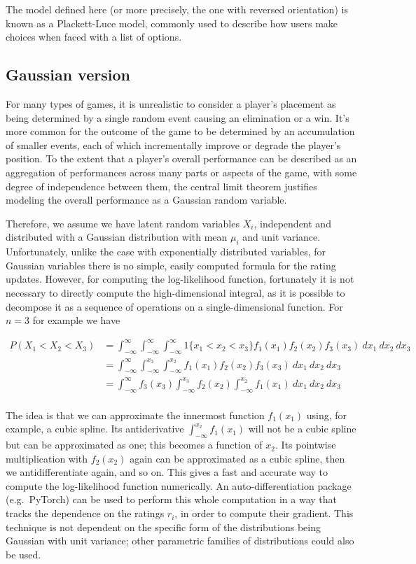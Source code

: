 \documentclass{article}
\begin{document}
	The model defined here (or more precisely, the one with reversed orientation) is known as a Plackett-Luce model, commonly used to describe how users make choices when faced with a list of options.
	
	\subsection{Gaussian version}
	For many types of games, it is unrealistic to consider a player's placement as being determined by a single random event causing an elimination or a win. It's more common for the outcome of the game to be determined by an accumulation of smaller events, each of which incrementally improve or degrade the player's position. To the extent that a player's overall performance can be described as an aggregation of performances across many parts or aspects of the game, with some degree of independence between them, the central limit theorem justifies modeling the overall performance as a Gaussian random variable.
	
	Therefore, we assume we have latent random variables $X_i$, independent and distributed with a Gaussian distribution with mean $\mu_i$ and unit variance. Unfortunately, unlike the case with exponentially distributed variables, for Gaussian variables there is no simple, easily computed formula for the rating updates. However, for computing the log-likelihood function, fortunately it is not necessary to directly compute the high-dimensional integral, as it is possible to decompose
	it as a sequence of operations on a single-dimensional function. For $n=3$ for example we have
	
	\begin{align*}
	P(X_1 < X_2 < X_3) &= \int_{-\infty}^{\infty} \int_{-\infty}^{\infty} \int_{-\infty}^{\infty} 1\{x_1 < x_2 < x_3\} f_1(x_1) f_2(x_2) f_3(x_3)\ dx_1\ dx_2\ dx_3 \\
	&= \int_{-\infty}^{\infty} \int_{-\infty}^{x_3} \int_{-\infty}^{x_2} f_1(x_1) f_2(x_2) f_3(x_3)\ dx_1\ dx_2\ dx_3 \\
	&= \int_{-\infty}^{\infty} f_3(x_3) \int_{-\infty}^{x_3} f_2(x_2) \int_{-\infty}^{x_2} f_1(x_1) \ dx_1\ dx_2\ dx_3 \\
	\end{align*}
	
	The idea is that we can approximate the innermost function $f_1(x_1)$ using, for example, a cubic spline. Its antiderivative $\int_{-\infty}^{x_2} f_1(x_1)$ will 
	not be a cubic spline but can be approximated as one; this becomes a function of $x_2$. Its pointwise multiplication with $f_2(x_2)$ again can be approximated as a cubic spline, then we antidifferentiate again, and so on. This gives a fast and accurate way to compute the log-likelihood function numerically. An auto-differentiation package (e.g.\ PyTorch) can be used to perform this whole computation in a way that tracks the dependence on the ratings $r_i$, in order to
	compute their gradient. This technique is not dependent on the specific form of the distributions being Gaussian with unit variance; other parametric families of distributions could also be used.
	
\end{document}
